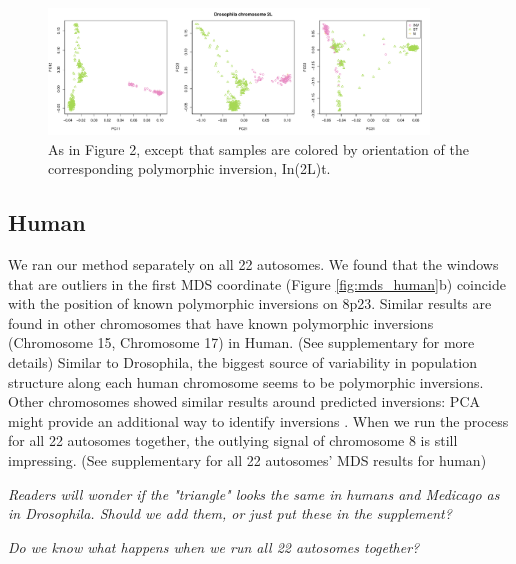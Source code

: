 \documentclass[11pt, oneside]{article}   	%
\newcommand{\plr}[1]{{\em \color{blue} #1}}
\begin{document}
\begin{figure}
    \begin{center}
       \includegraphics[width=0.9\textwidth]{Fig3_all_pca_plots_for_Chr2L_3peaks_color_by_In2Lt_byMDS}
    \end{center}
    \caption{
         As in Figure 2, except that samples are colored by orientation of the corresponding polymorphic inversion, In(2L)t.
        \label{fig:color_inver}
    }
\end{figure}

\subsection{Human}
We ran our method separately on all 22 autosomes. 
We found that the windows that are outliers in the first MDS coordinate (Figure \ref{fig:mds_human}b) coincide with the position of known polymorphic inversions on 8p23. 
Similar results are found in other chromosomes that have known polymorphic inversions (Chromosome 15, Chromosome 17) in Human. (See supplementary for more details)
Similar to Drosophila, the biggest source of variability in population structure along each human chromosome seems to be polymorphic inversions. Other chromosomes showed similar results around predicted inversions: PCA might provide an additional way to identify inversions \citep{ma2012investigation}.
When we run the process for all 22 autosomes together, the outlying signal of chromosome 8 is still impressing. (See supplementary for all 22 autosomes' MDS results for human)

\plr{Readers will wonder if the "triangle" looks the same in humans and Medicago as in Drosophila. Should we add them, or just put these in the supplement?}

\plr{Do we know what happens when we run all 22 autosomes together?}
\end{document}
